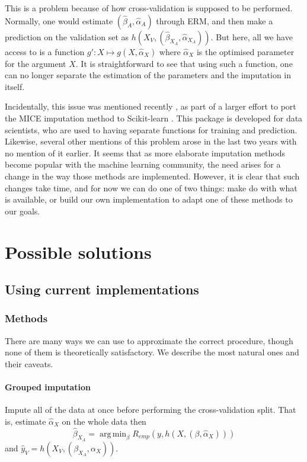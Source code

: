 \documentclass[12pt, a4paper]{memoir}
\DeclareMathOperator*{\argmin}{arg\,min}
\begin{document}
This is a problem because of how cross-validation is supposed to be performed. Normally, one would estimate $(\hat{\beta}_A, \hat{\alpha}_A)$ through ERM, and then make a prediction on the validation set as $h(X_V,(\hat{\beta}_{X_A},\hat{\alpha}_{X_A}))$. But here, all we have access to is a function $g': X \mapsto g(X, \hat{\alpha}_X)$ where $\hat{\alpha}_X$ is the optimised parameter for the argument $X$. It is straightforward to see that using such a function, one can no longer separate the estimation of the parameters and the imputation in itself.
	
Incidentally, this issue was mentioned recently \cite{github_sklearn}, as part of a larger effort to port the MICE \cite{MICE_founding} imputation method to Scikit-learn \cite{scikit-learn}. This package is developed for data scientists, who are used to having separate functions for training and prediction. Likewise, several other mentions of this problem arose in the last two years \cite{thread_newdata1}\cite{thread_newdata2}\cite{thread_newdata3} with no mention of it earlier. It seems that as more elaborate imputation methods become popular with the machine learning community, the need arises for a change in the way those methods are implemented. However, it is clear that such changes take time, and for now we can do one of two things: make do with what is available, or build our own implementation to adapt one of these methods to our goals.
	\section{Possible solutions}
		\subsection{Using current implementations}
			\subsubsection{Methods}
There are many ways we can use to approximate the correct procedure, though none of them is theoretically satisfactory. We describe the most natural ones and their caveats.

\paragraph{Grouped imputation} Impute all of the data at once before performing the cross-validation split. That is, estimate $\hat{\alpha}_X$ on the whole data then $$\hat{\beta}_{X_A} = \argmin_{\beta} R_{emp}(y, h(X, (\beta, \hat{\alpha}_X)))$$
 and $\hat{y}_V = h(X_V, (\beta_{X_A}, \alpha_X))$. 
\end{document}
